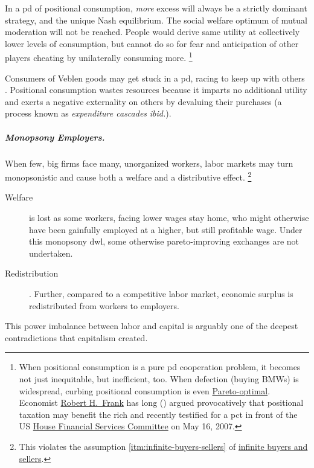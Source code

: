 In a \gls{pd} of positional consumption, \emph{more} excess will always be a strictly dominant strategy, and the unique Nash equilibrium.
The social welfare optimum of mutual moderation will not be reached.
People would derive same utility at collectively lower levels of consumption, but cannot do so for fear and anticipation of other players cheating by unilaterally consuming more.
\footnote{
	When positional consumption is a pure \gls{pd} cooperation problem, it becomes not just inequitable, but inefficient, too.
	When defection (buying BMWs) is widespread, curbing positional consumption is even \hyperref[sec:Pareto]{Pareto-optimal}.
	Economist \hyperref[http://www.robert-h-frank.com]{Robert H.~Frank} has long (\citeyear{Frank1987}) argued provocatively that positional taxation may benefit the rich and recently testified for a \gls{pct} in front of the US \hyperref[http://financialservices.house.gov/]{House Financial Services Committee} on May 16, 2007.
}

Consumers of Veblen goods may get stuck in a \gls{pd}, racing to keep up with others \citep{Frank1987}.
Positional consumption wastes resources because it imparts no additional utility and exerts a negative externality on others by devaluing their purchases (a process known as \emph{expenditure cascades} \emph{ibid.}).

\subparagraph[Monopsony Employers]{Monopsony Employers.}
	\label{sec:monopsony-employers}
When few, big firms face many, unorganized workers, labor markets may turn monopsonistic and cause both a welfare and a distributive effect.
\footnote{
	This violates the  assumption \ref{itm:infinite-buyers-sellers} of \hyperref[itm:infinite-buyers-sellers]{infinite buyers and sellers}.
}
\begin{description}
	\item[Welfare] is lost as some workers, facing lower wages stay home, who might otherwise have been gainfully employed at a higher, but still profitable wage.
	Under this monopsony \gls{dwl}, some otherwise pareto-improving exchanges are not undertaken.

	\item[Redistribution].
	Further, compared to a competitive labor market, economic surplus is redistributed from workers to employers.
\end{description}

This power imbalance between labor and capital is arguably one of the deepest contradictions that capitalism created.

